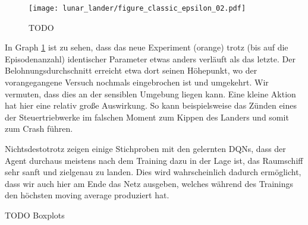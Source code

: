 \begin{figure}[h!]
    \centering
    \texttt{[image: lunar\_lander/figure\_classic\_epsilon\_02.pdf]}
    \caption{TODO} \label{img:graphClassicEps02}
\end{figure}

In Graph \ref{img:graphClassicEps02} ist zu sehen, dass das neue Experiment (orange) trotz (bis auf die Episodenanzahl) identischer Parameter etwas anders verläuft als das letzte. Der Belohnungsdurchschnitt erreicht etwa dort seinen Höhepunkt, wo der vorangegangene Versuch nochmals eingebrochen ist und umgekehrt. Wir vermuten, dass dies an der sensiblen Umgebung liegen kann. Eine kleine Aktion hat hier eine relativ große Auswirkung. So kann beispielsweise das Zünden eines der Steuertriebwerke im falschen Moment zum Kippen des Landers und somit zum Crash führen.

Nichtsdestotrotz zeigen einige Stichproben mit den gelernten DQNs, dass der Agent durchaus meistens nach dem Training dazu in der Lage ist, das Raumschiff sehr sanft und zielgenau zu landen. Dies wird wahrscheinlich dadurch ermöglicht, dass wir auch hier am Ende das Netz ausgeben, welches während des Trainings den höchsten moving average produziert hat.

TODO Boxplots